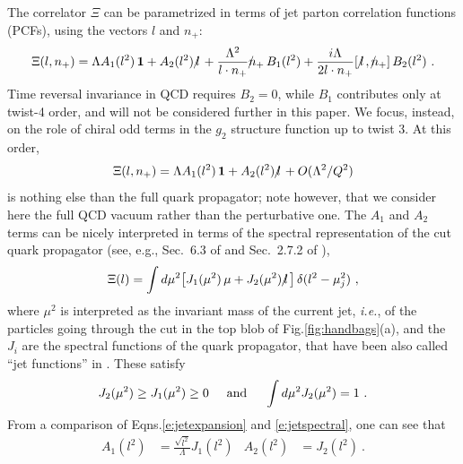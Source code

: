\documentclass[preprintnumbers,floatfix,nofootinbib]{revtex4}
\newcommand{\lslash}{l \hspace{-0.19cm} / \,}
\newcommand{\nslash}{n \hspace{-0.24cm} / \,}
\begin{document}
The correlator $\Xi$ can be parametrized in terms of jet parton correlation
functions (PCFs), using the vectors $l$ and $n_+$: 
\begin{equation}
\Xi(l,n_+) = \Lambda A_1(l^2)\,{\bm 1} + A_2(l^2)\,\lslash 
+ \frac{\Lambda^2}{l \cdot n_{+}} \nslash_+ \, B_{1}(l^2)
+ \frac{i \Lambda}{2 l \cdot n_{+}} [\,\lslash,\nslash_+ ] \, B_{2}(l^2) \ .
\label{e:jetexpansion}
\end{equation} 
Time reversal invariance in QCD requires $B_{2}=0$, while $B_{1}$ contributes
only at twist-4 order, and will not be considered further in this paper. We
focus, instead, on the role of chiral odd terms in the $g_2$ structure function up to twist 3. At this order, 
\begin{equation}
  \Xi(l,n_+) = \Lambda A_1(l^2)\,{\bm 1} + A_2(l^2)\,\lslash 
    + O(\Lambda^2/Q^2)
\label{e:jetexpansion-tw3}
\end{equation} 
is nothing else than the full quark propagator; note however, that we consider
here the full QCD vacuum rather than the perturbative one.  
The $A_1$ and $A_2$ terms can be nicely interpreted in terms of the spectral
representation of the cut quark propagator (see, e.g., Sec.~6.3 of
\cite{D'Hoker:2004aa} and Sec.~2.7.2 of \cite{Romao:2013aa}),
\begin{align} 
  \Xi(l) =  
  \int d \mu^2 \big[ J_1 (\mu^2)\,\mu + J_2 (\mu^2)\,\lslash \big] \,
  \delta(l^2 -\mu_j^2) \ ,
\label{e:jetspectral}
\end{align}
where $\mu^2$ is interpreted as the invariant mass of the current jet, {\it
  i.e.}, of the particles going through the cut in the top blob of
Fig.\ref{fig:handbags}(a), and the $J_i$ are the spectral functions of the
quark propagator, that have been also called ``jet functions'' in
\cite{Accardi:2008ne}. These satisfy
\begin{align}
  J_2(\mu^2) \geq J_1(\mu^2) \geq 0
  \hspace*{0.5cm} \text{and} \hspace*{0.5cm}
  \int d\mu^2 J_2(\mu^2) = 1 \ .
\label{eq:jetfnsprops}
\end{align}
From a comparison of Eqns.\eqref{e:jetexpansion} and \eqref{e:jetspectral}, one can see that 
\begin{align}
  A_1(l^2)&=\frac{\sqrt{l^2}}{\Lambda}J_1(l^2) & A_2(l^2)&=J_2(l^2) \ .
  \label{eq:jet_vs_spectral}
\end{align}
\end{document}
